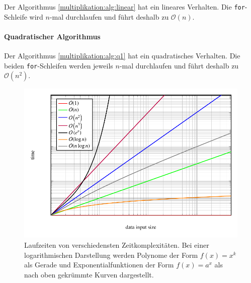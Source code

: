 Der Algorithmus \ref{multiplikation:alg:linear} hat ein lineares Verhalten.
Die \texttt{for}-Schleife wird $n$-mal durchlaufen und f\"uhrt deshalb zu $\mathcal{O}(n)$.

\paragraph{Quadratischer Algorithmus}

Der Algorithmus \ref{multiplikation:alg:q1} hat ein quadratisches Verhalten.
Die beiden \texttt{for}-Schleifen werden jeweils $n$-mal durchlaufen und f\"uhrt deshalb zu $\mathcal{O} (n^2 )$.


\begin{figure}
	\center
	\includegraphics[]{papers/multiplikation/images/bigo}
	\caption{Laufzeiten von verschiedensten Zeitkomplexitäten. Bei einer logarithmischen Darstellung werden Polynome der Form $f(x) = x^k$ als Gerade und Exponentialfunktionen der Form $f(x) = a^x$ als nach oben gekr\"ummte Kurven dargestellt.}
	\label{multiplikation:fig:bigo}
\end{figure}
